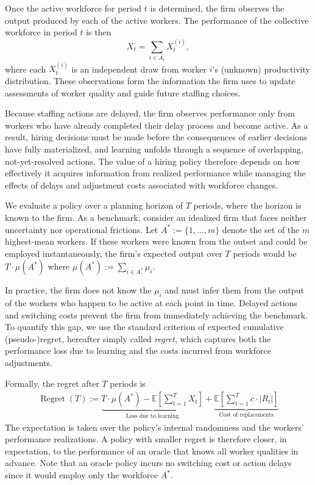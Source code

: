 \documentclass[opre,blindrev]{informs3}
\newcommand{\Regret}{\operatorname{Regret}}
\begin{document}
Once the active workforce for period \(t\) is determined, the firm observes the output produced by each of the active workers. The performance of the collective workforce in period \(t\) is then
\[
    X_t = \sum_{i \in A_t} X_t^{(i)},
\]
where each \(X_t^{(i)}\) is an independent draw from worker \(i\)'s (unknown) productivity distribution. These observations form the information the firm uses to update assessments of worker quality and guide future staffing choices.

Because staffing actions are delayed, the firm observes performance only from workers who have already completed their delay process and become active. As a result, hiring decisions must be made before the consequences of earlier decisions have fully materialized, and learning unfolds through a sequence of overlapping, not-yet-resolved actions. The value of a hiring policy therefore depends on how effectively it acquires information from realized performance while managing the effects of delays and adjustment costs associated with workforce changes.

We evaluate a policy over a planning horizon of \(T\) periods, where the horizon is known to the firm. As a benchmark, consider an idealized firm that faces neither uncertainty nor operational frictions. Let \(A^* := \{1,\dots,m\}\)
denote the set of the \(m\) highest-mean workers. If these workers were known from the outset and could be employed instantaneously, the firm's expected output over \(T\) periods would be \(T \cdot \mu(A^*)\) where \(\mu(A^*) := \sum_{i \in A^*} \mu_i\).

In practice, the firm does not know the \(\mu_i\) and must infer them from the output of the workers who happen to be active at each point in time. Delayed actions and switching costs prevent the firm from immediately achieving the benchmark. To quantify this gap, we use the standard criterion of expected cumulative (pseudo-)regret, hereafter simply called \emph{regret}, which captures both the performance loss due to learning and the costs incurred from workforce adjustments.

Formally, the regret after \(T\) periods is
\begin{eqnarray}\label{def:regret}
    \Regret(T):=
    \underbrace{T \cdot \mu(A^*) - \mathbb{E}\!\left[\sum_{t=1}^T X_t\right]}_{\text{Loss due to learning}}
    + \underbrace{\mathbb{E}\!\left[\sum_{t=1}^T c \cdot |R_t|\right]}_{\text{Cost of replacements}}
\end{eqnarray}
The expectation is taken over the policy's internal randomness and the workers’ performance realizations. A policy with smaller regret is therefore closer, in expectation, to the performance of an oracle that knows all worker qualities in advance. Note that an oracle policy incurs no switching cost or action delays since it would employ only the workforce \(A^*\).
\end{document}
